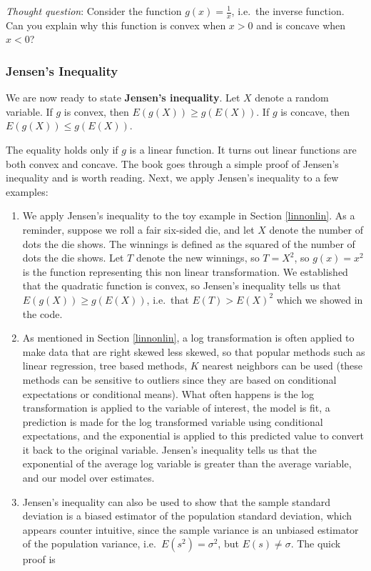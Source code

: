 \documentclass[
]{book}
\begin{document}
\emph{Thought question}: Consider the function \(g(x) = \frac{1}{x}\), i.e.~the inverse function. Can you explain why this function is convex when \(x>0\) and is concave when \(x<0\)?

\subsubsection{Jensen's Inequality}\label{jensens-inequality-1}

We are now ready to state \textbf{Jensen's inequality}. Let \(X\) denote a random variable. If \(g\) is convex, then \(E(g(X)) \geq g(E(X))\). If \(g\) is concave, then \(E(g(X)) \leq g(E(X))\).

The equality holds only if \(g\) is a linear function. It turns out linear functions are both convex and concave. The book goes through a simple proof of Jensen's inequality and is worth reading. Next, we apply Jensen's inequality to a few examples:

\begin{enumerate}
\def\labelenumi{\arabic{enumi}.}
\item
  We apply Jensen's inequality to the toy example in Section \ref{linnonlin}. As a reminder, suppose we roll a fair six-sided die, and let \(X\) denote the number of dots the die shows. The winnings is defined as the squared of the number of dots the die shows. Let \(T\) denote the new winnings, so \(T = X^2\), so \(g(x) = x^2\) is the function representing this non linear transformation. We established that the quadratic function is convex, so Jensen's inequality tells us that \(E(g(X)) \geq g(E(X))\), i.e.~that \(E(T) > E(X)^2\) which we showed in the code.
\item
  As mentioned in Section \ref{linnonlin}, a log transformation is often applied to make data that are right skewed less skewed, so that popular methods such as linear regression, tree based methods, \(K\) nearest neighbors can be used (these methods can be sensitive to outliers since they are based on conditional expectations or conditional means). What often happens is the log transformation is applied to the variable of interest, the model is fit, a prediction is made for the log transformed variable using conditional expectations, and the exponential is applied to this predicted value to convert it back to the original variable. Jensen's inequality tells us that the exponential of the average log variable is greater than the average variable, and our model over estimates.
\item
  Jensen's inequality can also be used to show that the sample standard deviation is a biased estimator of the population standard deviation, which appears counter intuitive, since the sample variance is an unbiased estimator of the population variance, i.e.~\(E(s^2) = \sigma^2\), but \(E(s) \neq \sigma\). The quick proof is
\end{enumerate}
\end{document}
